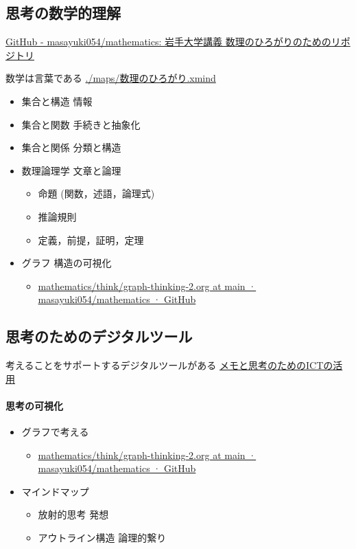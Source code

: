 \documentclass[dvipdfmx,11pat]{jarticle}
\begin{document}
\subsection{思考の数学的理解}
\label{sec:orgee9e057}
\href{https://github.com/masayuki054/mathematics/tree/main}{GitHub - masayuki054/mathematics: 岩手大学講義 数理のひろがりのためのリポジトリ}

数学は言葉である \url{./maps/数理のひろがり.xmind} 
\begin{itemize}
\item 集合と構造 情報
\item 集合と関数 手続きと抽象化
\item 集合と関係 分類と構造
\item 数理論理学 文章と論理
\begin{itemize}
\item 命題 (関数，述語，論理式)
\item 推論規則
\item 定義，前提，証明，定理
\end{itemize}
\item グラフ 構造の可視化
\begin{itemize}
\item \href{https://github.com/masayuki054/mathematics/blob/main/think/graph-thinking-2.org}{mathematics/think/graph-thinking-2.org at main · masayuki054/mathematics · GitHub}
\end{itemize}
\end{itemize}
\subsection{思考のためのデジタルツール}
\label{sec:orgfce44a0}
考えることをサポートするデジタルツールがある \href{https://masayuki054.github.io/ict\_literacy\_for\_thinking\_and\_memo/}{メモと思考のためのICTの活用}
\paragraph{思考の可視化}
\label{sec:org986b5c1}
\begin{itemize}
\item グラフで考える
\begin{itemize}
\item \href{https://github.com/masayuki054/mathematics/blob/main/think/graph-thinking-2.org}{mathematics/think/graph-thinking-2.org at main · masayuki054/mathematics · GitHub}
\end{itemize}
\item マインドマップ
\begin{itemize}
\item 放射的思考 発想
\item アウトライン構造 論理的繋り
\end{itemize}
\end{itemize}
\end{document}
